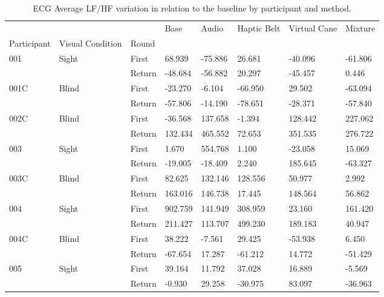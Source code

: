 
\begin{table}[!htb]
\centering
\caption{ECG Average LF/HF variation in relation to the baseline by participant and method.}
\label{tab:ecg_lfhf_variation}
\begin{tabular}{llllllll}
\toprule
    &       &        &    Base &   Audio & Haptic Belt & Virtual Cane & Mixture \\
Participant & Visual Condition & Round &         &         &             &              &         \\
\midrule
001 & Sight & First &  68.939 & -75.886 &      26.681 &      -40.096 & -61.806 \\
    &       & Return & -48.684 & -56.882 &      20.297 &      -45.457 &   0.446 \\
001C & Blind & First & -23.270 &  -6.104 &     -66.950 &       29.502 & -63.094 \\
    &       & Return & -57.806 & -14.190 &     -78.651 &      -28.371 & -57.840 \\
002C & Blind & First & -36.568 & 137.658 &      -1.394 &      128.442 & 227.062 \\
    &       & Return & 132.434 & 465.552 &      72.653 &      351.535 & 276.722 \\
003 & Sight & First &   1.670 & 554.768 &       1.100 &      -23.058 &  15.069 \\
    &       & Return & -19.005 & -18.409 &       2.240 &      185.645 & -63.327 \\
003C & Blind & First &  82.625 & 132.146 &     128.556 &       50.977 &   2.992 \\
    &       & Return & 163.016 & 146.738 &      17.445 &      148.564 &  56.862 \\
004 & Sight & First & 902.759 & 141.949 &     308.959 &       23.160 & 161.420 \\
    &       & Return & 211.427 & 113.707 &     499.230 &      189.183 &  40.947 \\
004C & Blind & First &  38.222 &  -7.561 &      29.425 &      -53.938 &   6.450 \\
    &       & Return & -67.654 &  17.287 &     -61.212 &       14.772 & -51.429 \\
005 & Sight & First &  39.164 &  11.792 &      37.028 &       16.889 &  -5.569 \\
    &       & Return &  -0.930 &  29.258 &     -30.975 &       83.097 & -36.963 \\
\bottomrule
\end{tabular}
\end{table}

